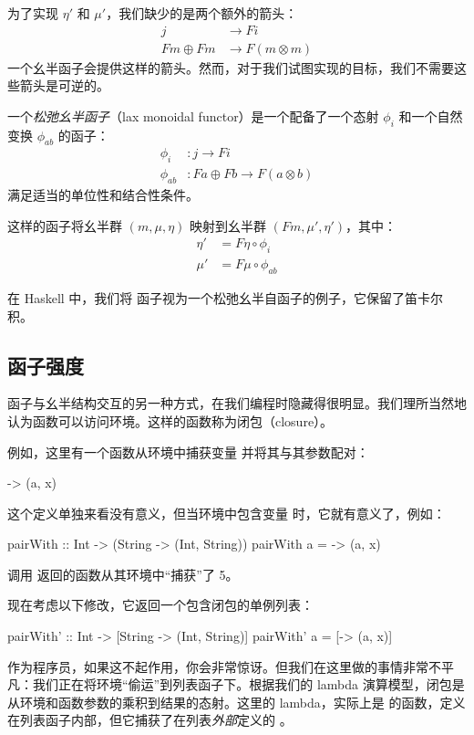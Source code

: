 \documentclass[DaoFP]{subfiles}
\begin{document}
为了实现 $\eta'$ 和 $\mu'$，我们缺少的是两个额外的箭头：
\begin{align*}
j &\to F i\\
 F m \oplus F m &\to F (m \otimes m)
 \end{align*}
一个幺半函子会提供这样的箭头。然而，对于我们试图实现的目标，我们不需要这些箭头是可逆的。

一个\emph{松弛幺半函子}（lax monoidal functor）是一个配备了一个态射 $\phi_i$ 和一个自然变换 $\phi_{ab}$ 的函子：
\begin{align*}
\phi_i &\colon j \to F i \\
\phi_{a b} &\colon F a \oplus F b \to F (a \otimes b)
\end{align*}
满足适当的单位性和结合性条件。

这样的函子将幺半群 $(m, \mu, \eta)$ 映射到幺半群 $(F m, \mu', \eta')$，其中：
\begin{align*}
\eta' &= F \eta \circ \phi_i \\
\mu' &= F \mu \circ \phi_{a b}
\end{align*}

在 Haskell 中，我们将  函子视为一个松弛幺半自函子的例子，它保留了笛卡尔积。

\subsection{函子强度}

函子与幺半结构交互的另一种方式，在我们编程时隐藏得很明显。我们理所当然地认为函数可以访问环境。这样的函数称为闭包（closure）。

例如，这里有一个函数从环境中捕获变量  并将其与其参数配对：
\begin{haskell}
\x -> (a, x)
\end{haskell}
这个定义单独来看没有意义，但当环境中包含变量  时，它就有意义了，例如：
\begin{haskell}
pairWith :: Int -> (String -> (Int, String))
pairWith a = \x -> (a, x)
\end{haskell}
调用  返回的函数从其环境中“捕获”了 5。

现在考虑以下修改，它返回一个包含闭包的单例列表：
\begin{haskell}
pairWith' :: Int -> [String -> (Int, String)]
pairWith' a = [\x -> (a, x)]
\end{haskell}
作为程序员，如果这不起作用，你会非常惊讶。但我们在这里做的事情非常不平凡：我们正在将环境“偷运”到列表函子下。根据我们的 lambda 演算模型，闭包是从环境和函数参数的乘积到结果的态射。这里的 lambda，实际上是  的函数，定义在列表函子内部，但它捕获了在列表\emph{外部}定义的 。
\end{document}
